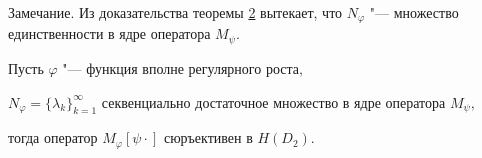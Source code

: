 


\smallskip



{\small \sc Замечание.} Из доказательства теоремы \hyperlink{nap:z:t2}{2} вытекает, что $N_{\varphi}$ "--- множество единственности в ядре оператора $M_\psi$.



\smallskip




\hypertarget{nap:z:t3}{}

\begin{theorem}[3]Пусть $\varphi$ "--- функция вполне регулярного роста$,$ 

$N_{\varphi}=\{\lambda_k\}_{k=1}^{\infty}$ секвенциально достаточное множество в ядре оператора $M_\psi,$ 

тогда оператор $M_\varphi[\psi \cdot]$  сюръективен в $H(D_2).$

\end{theorem}



\smallskip



